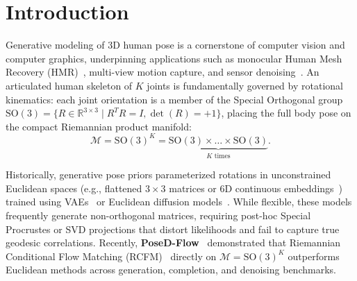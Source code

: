 \documentclass[10pt,twocolumn,letterpaper]{article}
\begin{document}
\section{Introduction}

Generative modeling of 3D human pose is a cornerstone of computer vision and computer graphics, underpinning applications such as monocular Human Mesh Recovery (HMR)~\cite{bogo2016keep,pavlakos2019expressive}, multi-view motion capture, and sensor denoising~\cite{von2018recovering}. An articulated human skeleton of $K$ joints is fundamentally governed by rotational kinematics: each joint orientation is a member of the Special Orthogonal group $\mathrm{SO}(3) = \{ R \in \mathbb{R}^{3 \times 3} \mid R^T R = I, \det(R) = +1 \}$, placing the full body pose on the compact Riemannian product manifold:
\begin{equation}
\mathcal{M} = \mathrm{SO}(3)^K = \underbrace{\mathrm{SO}(3) \times \dots \times \mathrm{SO}(3)}_{K \text{ times}}.
\end{equation}

Historically, generative pose priors parameterized rotations in unconstrained Euclidean spaces (e.g., flattened $3 \times 3$ matrices or $6\mathrm{D}$ continuous embeddings~\cite{zhou2019continuity}) trained using VAEs~\cite{pavlakos2019expressive} or Euclidean diffusion models~\cite{choi2023dposer,tevet2022human}. While flexible, these models frequently generate non-orthogonal matrices, requiring post-hoc Special Procrustes or SVD projections that distort likelihoods and fail to capture true geodesic correlations. Recently, \textbf{PoseD-Flow}~\cite{nadar2026posedflow} demonstrated that Riemannian Conditional Flow Matching (RCFM)~\cite{chen2023riemannian} directly on $\mathcal{M} = \mathrm{SO}(3)^K$ outperforms Euclidean methods across generation, completion, and denoising benchmarks.
\end{document}
